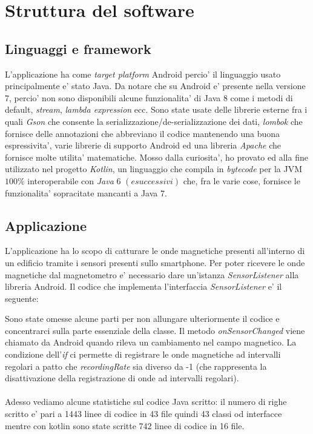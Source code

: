 \chapter{Struttura del software}

\section{Linguaggi e framework}
L'applicazione ha come \textit{target platform} Android percio' il linguaggio usato principalmente e' stato Java. Da notare che su Android e' presente nella versione 7, percio' non sono disponibili alcune funzionalita' di Java 8 come i metodi di default, \textit{stream}, \textit{lambda expression} ecc. Sono state usate delle librerie esterne fra i quali \textit{Gson} che consente la serializzazione/de-serializzazione dei dati, \textit{lombok} che fornisce delle annotazioni che abbreviano il codice mantenendo una buona espressivita', varie librerie di supporto Android ed una libreria \textit{Apache} che fornisce molte utilita' matematiche. Mosso dalla curiosita', ho provato ed alla fine utilizzato nel progetto \textit{Kotlin}, un linguaggio che compila in \textit{bytecode} per la JVM $100 \%$ interoperabile con \textit{Java} 6 $(e successivi)$ che, fra le varie cose, fornisce le funzionalita' sopracitate mancanti a Java 7.

\section{Applicazione}
L'applicazione ha lo scopo di catturare le onde magnetiche presenti all'interno di un edificio tramite i sensori presenti sullo smartphone. Per poter ricevere le onde magnetiche dal magnetometro e' necessario dare un'istanza \textit{SensorListener} alla libreria Android. Il codice che implementa l'interfaccia \textit{SensorListener} e' il seguente:


Sono state omesse alcune parti per non allungare ulteriormente il codice e concentrarci sulla parte essenziale della classe. Il metodo \textit{onSensorChanged} viene chiamato da Android quando rileva un cambiamento nel campo magnetico. La condizione dell'\textit{if} ci permette di registrare le onde magnetiche ad intervalli regolari a patto che \textit{recordingRate} sia diverso da -1 (che rappresenta la  disattivazione della registrazione di onde ad intervalli regolari).
\\\\
Adesso vediamo alcune statistiche sul codice Java scritto: il numero di righe scritto e' pari a 1443 linee di codice in 43 file quindi 43 classi od interfacce mentre con kotlin sono state scritte 742 linee di codice in 16 file.

